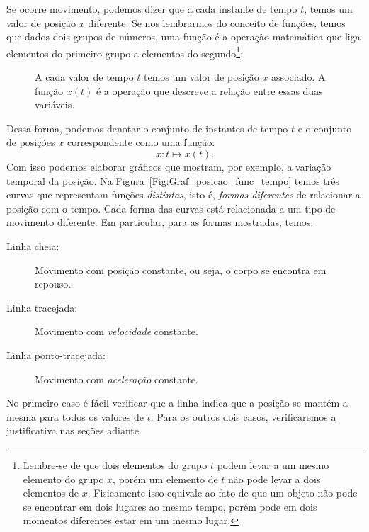 Se ocorre movimento, podemos dizer que a cada instante de tempo $t$, temos um valor de posição $x$ diferente. Se nos lembrarmos do conceito de funções, temos que dados dois grupos de números, uma função é a operação matemática que liga elementos do primeiro grupo a elementos do segundo\footnote[][-2cm]{Lembre-se de que dois elementos do grupo $t$ podem levar a um mesmo elemento do grupo $x$, porém um elemento de $t$ não pode levar a dois elementos de $x$. Fisicamente isso equivale ao fato de que um objeto não pode se encontrar em dois lugares ao mesmo tempo, porém pode em dois momentos diferentes estar em um mesmo lugar.}:
\begin{figure}\forcerectofloat
\centering
{}
\caption{A cada valor de tempo $t$ temos um valor de posição $x$ associado. A função $x(t)$ é a operação que descreve a relação entre essas duas variáveis.}
\end{figure}

Dessa forma, podemos denotar o conjunto de instantes de tempo $t$ e o conjunto de posições $x$ correspondente como uma função:
\begin{equation}
    x: t \mapsto x(t).
\end{equation}
%
Com isso podemos elaborar gráficos que mostram, por exemplo, a variação temporal da posição. Na Figura~\ref{Fig:Graf_posicao_func_tempo} temos três curvas que representam funções \emph{distintas}, isto é, \emph{formas diferentes} de relacionar a posição com o tempo. Cada forma das curvas está relacionada a um tipo de movimento diferente. Em particular, para as formas mostradas, temos:
\begin{description}
    \item[Linha cheia:] Movimento com posição constante, ou seja, o corpo se encontra em repouso.
    \item[Linha tracejada:] Movimento com \emph{velocidade} constante.
    \item[Linha ponto-tracejada:] Movimento com \emph{aceleração} constante.
\end{description}
%
No primeiro caso é fácil verificar que a linha indica que a posição se mantém a mesma para todos os valores de $t$. Para os outros dois casos, verificaremos a justificativa nas seções adiante.

